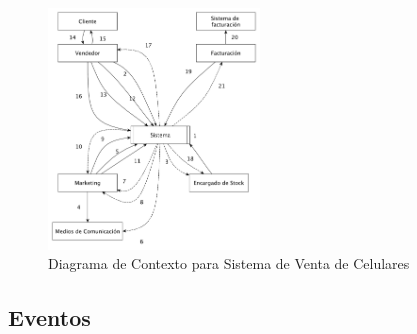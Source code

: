 \begin{figure}[h!]
  \centering
  \includegraphics[width=0.5\textwidth]{./imagenes/contexto_1.pdf}
  \caption{Diagrama de Contexto para Sistema de Venta de Celulares}
\end{figure}

\subsection{Eventos}

